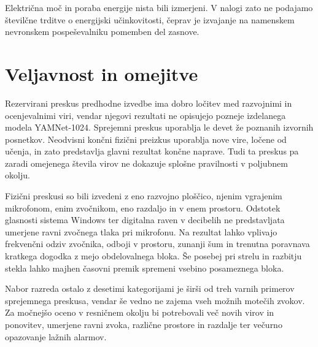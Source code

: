 Električna moč in poraba energije nista bili izmerjeni. V nalogi zato ne
podajamo številčne trditve o energijski učinkovitosti, čeprav je izvajanje na
namenskem nevronskem pospeševalniku pomemben del zasnove.

\section{Veljavnost in omejitve}

Rezervirani preskus predhodne izvedbe ima dobro ločitev med razvojnimi in
ocenjevalnimi viri, vendar njegovi rezultati ne opisujejo pozneje izdelanega
modela YAMNet-1024. Sprejemni preskus uporablja le devet že poznanih izvornih
posnetkov. Neodvisni končni fizični preizkus uporablja nove vire, ločene od
učenja, in zato predstavlja glavni rezultat končne naprave. Tudi ta preskus pa
zaradi omejenega števila virov ne dokazuje splošne pravilnosti v poljubnem
okolju.

Fizični preskusi so bili izvedeni z eno razvojno ploščico, njenim
vgrajenim mikrofonom, enim zvočnikom, eno razdaljo in v enem prostoru.
Odstotek glasnosti sistema Windows ter digitalna raven v decibelih ne
predstavljata umerjene ravni zvočnega tlaka pri mikrofonu. Na rezultat lahko
vplivajo frekvenčni odziv zvočnika, odboji v prostoru, zunanji šum in trenutna
poravnava kratkega dogodka z mejo obdelovalnega bloka. Še posebej pri strelu in
razbitju stekla lahko majhen časovni premik spremeni vsebino posameznega
bloka.

Nabor razreda ostalo z desetimi kategorijami je širši od treh varnih primerov
sprejemnega preskusa, vendar še vedno ne zajema vseh možnih motečih zvokov. Za
močnejšo oceno v resničnem okolju bi potrebovali več novih virov in ponovitev,
umerjene ravni zvoka, različne prostore in razdalje ter večurno opazovanje
lažnih alarmov.
